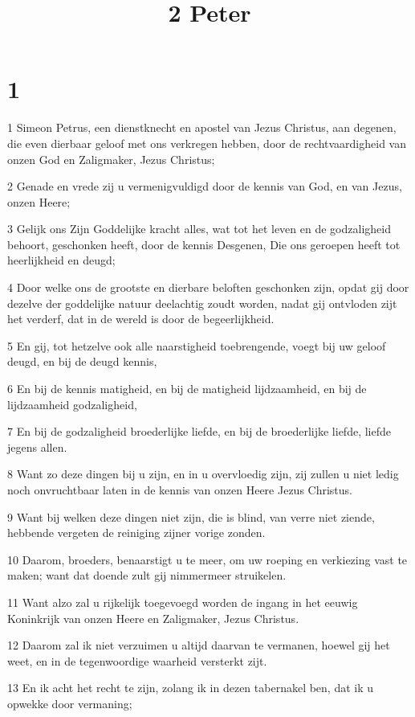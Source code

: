 

\title{2 Peter}



\chapter{1}

\par 1 Simeon Petrus, een dienstknecht en apostel van Jezus Christus, aan degenen, die even dierbaar geloof met ons verkregen hebben, door de rechtvaardigheid van onzen God en Zaligmaker, Jezus Christus;
\par 2 Genade en vrede zij u vermenigvuldigd door de kennis van God, en van Jezus, onzen Heere;
\par 3 Gelijk ons Zijn Goddelijke kracht alles, wat tot het leven en de godzaligheid behoort, geschonken heeft, door de kennis Desgenen, Die ons geroepen heeft tot heerlijkheid en deugd;
\par 4 Door welke ons de grootste en dierbare beloften geschonken zijn, opdat gij door dezelve der goddelijke natuur deelachtig zoudt worden, nadat gij ontvloden zijt het verderf, dat in de wereld is door de begeerlijkheid.
\par 5 En gij, tot hetzelve ook alle naarstigheid toebrengende, voegt bij uw geloof deugd, en bij de deugd kennis,
\par 6 En bij de kennis matigheid, en bij de matigheid lijdzaamheid, en bij de lijdzaamheid godzaligheid,
\par 7 En bij de godzaligheid broederlijke liefde, en bij de broederlijke liefde, liefde jegens allen.
\par 8 Want zo deze dingen bij u zijn, en in u overvloedig zijn, zij zullen u niet ledig noch onvruchtbaar laten in de kennis van onzen Heere Jezus Christus.
\par 9 Want bij welken deze dingen niet zijn, die is blind, van verre niet ziende, hebbende vergeten de reiniging zijner vorige zonden.
\par 10 Daarom, broeders, benaarstigt u te meer, om uw roeping en verkiezing vast te maken; want dat doende zult gij nimmermeer struikelen.
\par 11 Want alzo zal u rijkelijk toegevoegd worden de ingang in het eeuwig Koninkrijk van onzen Heere en Zaligmaker, Jezus Christus.
\par 12 Daarom zal ik niet verzuimen u altijd daarvan te vermanen, hoewel gij het weet, en in de tegenwoordige waarheid versterkt zijt.
\par 13 En ik acht het recht te zijn, zolang ik in dezen tabernakel ben, dat ik u opwekke door vermaning;
